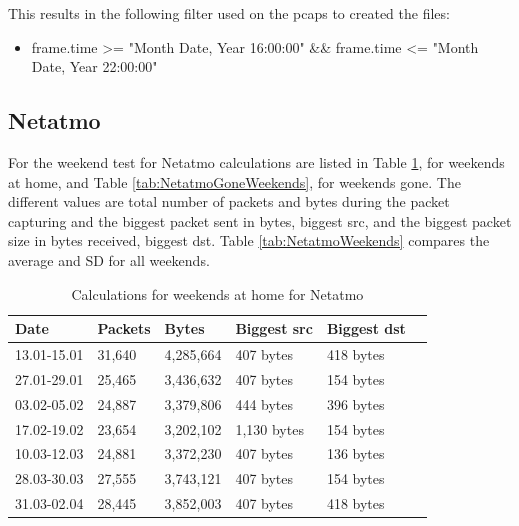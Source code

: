 This results in the following filter used on the pcaps to created the files: 

\begin{itemize}
    \item frame.time >= "Month Date, Year 16:00:00" \&\& frame.time <= "Month Date, Year 22:00:00"
\end{itemize}

\newpage
\subsection{Netatmo}
For the weekend test for Netatmo calculations are listed in Table \ref{tab:NetatmoHomeWeekends}, for weekends at home, and Table \ref{tab:NetatmoGoneWeekends}, for weekends gone. The different values are total number of packets and bytes during the packet capturing and the biggest packet sent in bytes, biggest src, and the biggest packet size in bytes received, biggest dst. Table \ref{tab:NetatmoWeekends} compares the average and \gls{SD} for all weekends. 

\begin{table}[H]
    \centering
    \caption{Calculations for weekends at home for Netatmo}
    \begin{tabular}{|l|l|l|l|l|l|}
    \hline
        \textbf{Date} & \textbf{Packets} & \textbf{Bytes}  & \textbf{Biggest src} & \textbf{Biggest dst} \\ \hline
        13.01-15.01   & 31,640           & 4,285,664       & 407 bytes            & 418 bytes            \\ \hline
        27.01-29.01   & 25,465           & 3,436,632       & 407 bytes            & 154 bytes            \\ \hline
        03.02-05.02   & 24,887           & 3,379,806       & 444 bytes            & 396 bytes            \\ \hline
        17.02-19.02   & 23,654           & 3,202,102       & 1,130 bytes          & 154 bytes            \\ \hline
        10.03-12.03   & 24,881           & 3,372,230       & 407 bytes            & 136 bytes            \\ \hline
        28.03-30.03   & 27,555           & 3,743,121       & 407 bytes            & 154 bytes            \\ \hline
        31.03-02.04   & 28,445           & 3,852,003       & 407 bytes            & 418 bytes            \\ \hline
    \end{tabular}
    \label{tab:NetatmoHomeWeekends}
\end{table}

